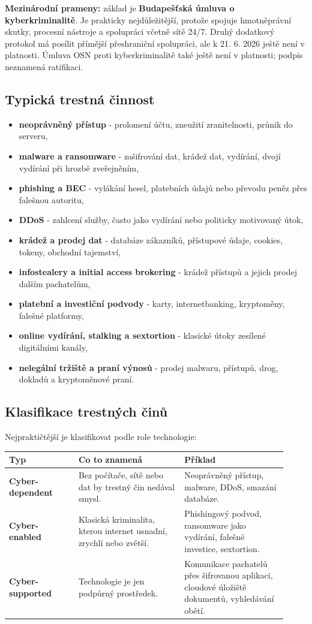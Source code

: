 \documentclass[11pt,a4paper]{article}
\begin{document}
\textbf{Mezinárodní prameny:} základ je \textbf{Budapešťská úmluva o kyberkriminalitě}. Je prakticky nejdůležitější, protože spojuje hmotněprávní skutky, procesní nástroje a spolupráci včetně sítě 24/7. Druhý dodatkový protokol má posílit přímější přeshraniční spolupráci, ale k 21. 6. 2026 ještě není v platnosti. Úmluva OSN proti kyberkriminalitě také ještě není v platnosti; podpis neznamená ratifikaci.

\subsection*{Typická trestná činnost}
\begin{itemize}
  \item \textbf{neoprávněný přístup} - prolomení účtu, zneužití zranitelnosti, průnik do serveru,
  \item \textbf{malware a ransomware} - zašifrování dat, krádež dat, vydírání, dvojí vydírání při hrozbě zveřejněním,
  \item \textbf{phishing a BEC} - vylákání hesel, platebních údajů nebo převodu peněz přes falešnou autoritu,
  \item \textbf{DDoS} - zahlcení služby, často jako vydírání nebo politicky motivovaný útok,
  \item \textbf{krádež a prodej dat} - databáze zákazníků, přístupové údaje, cookies, tokeny, obchodní tajemství,
  \item \textbf{infostealery a initial access brokering} - krádež přístupů a jejich prodej dalším pachatelům,
  \item \textbf{platební a investiční podvody} - karty, internetbanking, kryptoměny, falešné platformy,
  \item \textbf{online vydírání, stalking a sextortion} - klasické útoky zesílené digitálními kanály,
  \item \textbf{nelegální tržiště a praní výnosů} - prodej malwaru, přístupů, drog, dokladů a kryptoměnové praní.
\end{itemize}

\subsection*{Klasifikace trestných činů}
Nejpraktičtější je klasifikovat podle role technologie:
\begin{longtable}{p{0.23\linewidth}p{0.35\linewidth}p{0.34\linewidth}}
\toprule
\textbf{Typ} & \textbf{Co to znamená} & \textbf{Příklad}\\
\midrule
\textbf{Cyber-dependent} & Bez počítače, sítě nebo dat by trestný čin nedával smysl. & Neoprávněný přístup, malware, DDoS, smazání databáze.\\
\addlinespace
\textbf{Cyber-enabled} & Klasická kriminalita, kterou internet usnadní, zrychlí nebo zvětší. & Phishingový podvod, ransomware jako vydírání, falešné investice, sextortion.\\
\addlinespace
\textbf{Cyber-supported} & Technologie je jen podpůrný prostředek. & Komunikace pachatelů přes šifrovanou aplikaci, cloudové úložiště dokumentů, vyhledávání obětí.\\
\bottomrule
\end{longtable}
\end{document}
